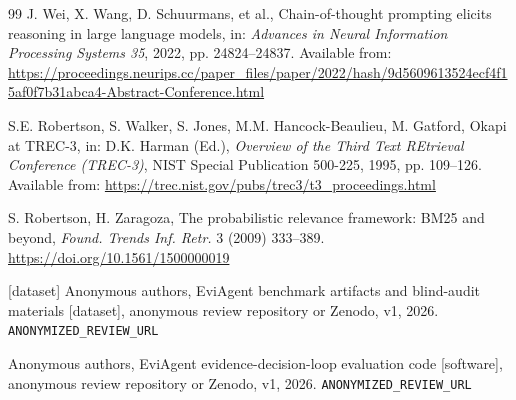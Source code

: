 \documentclass[11pt,a4paper]{article}
\begin{document}
\begin{thebibliography}{99}
J. Wei, X. Wang, D. Schuurmans, et al., Chain-of-thought prompting elicits reasoning in large language models, in: \emph{Advances in Neural Information Processing Systems 35}, 2022, pp. 24824--24837. Available from: \url{https://proceedings.neurips.cc/paper_files/paper/2022/hash/9d5609613524ecf4f15af0f7b31abca4-Abstract-Conference.html}

S.E. Robertson, S. Walker, S. Jones, M.M. Hancock-Beaulieu, M. Gatford, Okapi at TREC-3, in: D.K. Harman (Ed.), \emph{Overview of the Third Text REtrieval Conference (TREC-3)}, NIST Special Publication 500-225, 1995, pp. 109--126. Available from: \url{https://trec.nist.gov/pubs/trec3/t3_proceedings.html}

S. Robertson, H. Zaragoza, The probabilistic relevance framework: BM25 and beyond, \emph{Found. Trends Inf. Retr.} 3 (2009) 333--389. \url{https://doi.org/10.1561/1500000019}

[dataset] Anonymous authors, EviAgent benchmark artifacts and blind-audit materials [dataset], anonymous review repository or Zenodo, v1, 2026. \texttt{ANONYMIZED\_REVIEW\_URL}

Anonymous authors, EviAgent evidence-decision-loop evaluation code [software], anonymous review repository or Zenodo, v1, 2026. \texttt{ANONYMIZED\_REVIEW\_URL}

\end{thebibliography}
\end{document}
